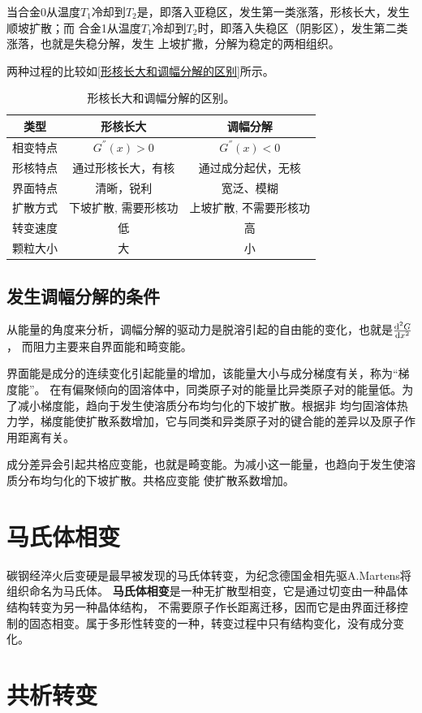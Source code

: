             当合金0从温度$T_1$冷却到$T_2$是，即落入亚稳区，发生第一类涨落，形核长大，发生顺坡扩散；而
            合金1从温度$T_1$冷却到$T_2$时，即落入失稳区（阴影区），发生第二类涨落，也就是失稳分解，发生
            上坡扩撒，分解为稳定的两相组织。

            两种过程的比较如\autoref{形核长大和调幅分解的区别}所示。
            \begin{table}[ht]
                \centering
                \caption{形核长大和调幅分解的区别。}
                \label{形核长大和调幅分解的区别}
                \begin{tabular}{ccc}
                    \toprule
                    类型&形核长大&调幅分解\\
                    \midrule
                    相变特点&$G^{''}(x)>0$&$G^{''}(x)<0$\\
                    形核特点&通过形核长大，有核&通过成分起伏，无核\\
                    界面特点&清晰，锐利&宽泛、模糊\\
                    扩散方式&下坡扩散, 需要形核功&上坡扩散, 不需要形核功\\
                    转变速度&低&高\\
                    颗粒大小&大&小\\
                    \bottomrule
                \end{tabular}
            \end{table}
        \subsection{发生调幅分解的条件}
            从能量的角度来分析，调幅分解的驱动力是脱溶引起的自由能的变化，也就是$\frac{\mathop{}\!\mathrm{d}^2 G }{\mathop{}\!\mathrm{d} x^2}$，
            而阻力主要来自界面能和畸变能。

            界面能是成分的连续变化引起能量的增加，该能量大小与成分梯度有关，称为“梯度能”。
            在有偏聚倾向的固溶体中，同类原子对的能量比异类原子对的能量低。为了减小梯度能，趋向于发生使溶质分布均匀化的下坡扩散。根据非
            均匀固溶体热力学，梯度能使扩散系数增加，它与同类和异类原子对的键合能的差异以及原子作用距离有关。

            成分差异会引起共格应变能，也就是畸变能。为减小这一能量，也趋向于发生使溶质分布均匀化的下坡扩散。共格应变能
            使扩散系数增加。
    \section{马氏体相变}
        碳钢经淬火后变硬是最早被发现的马氏体转变，为纪念德国金相先驱A.Martens将组织命名为马氏体。
        \textbf{马氏体相变}是一种无扩散型相变，它是通过切变由一种晶体结构转变为另一种晶体结构，
        不需要原子作长距离迁移，因而它是由界面迁移控制的固态相变。属于多形性转变的一种，转变过程中只有结构变化，没有成分变化。
    \section{共析转变}